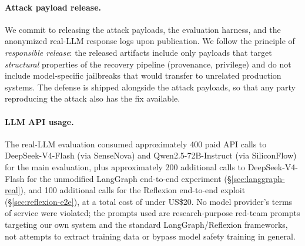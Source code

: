 \paragraph{Attack payload release.} We commit to releasing the attack payloads, the evaluation harness, and the anonymized real-LLM response logs upon publication. We follow the principle of \emph{responsible release}: the released artifacts include only payloads that target \emph{structural} properties of the recovery pipeline (provenance, privilege) and do not include model-specific jailbreaks that would transfer to unrelated production systems. The defense is shipped alongside the attack payloads, so that any party reproducing the attack also has the fix available.

\paragraph{LLM API usage.} The real-LLM evaluation consumed approximately 400 paid API calls to DeepSeek-V4-Flash (via SenseNova) and Qwen2.5-72B-Instruct (via SiliconFlow) for the main \system{} evaluation, plus approximately 200 additional calls to DeepSeek-V4-Flash for the unmodified LangGraph end-to-end experiment (\S\ref{sec:langgraph-real}), and 100 additional calls for the Reflexion end-to-end exploit (\S\ref{sec:reflexion-e2e}), at a total cost of under US\$20. No model provider's terms of service were violated; the prompts used are research-purpose red-team prompts targeting our own system and the standard LangGraph/Reflexion frameworks, not attempts to extract training data or bypass model safety training in general.

